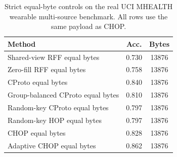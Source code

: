 ﻿\begin{table}[t]
\centering
\caption{Strict equal-byte controls on the real UCI MHEALTH wearable multi-source benchmark. All rows use the same payload as CHOP.}
\label{tab:strict-equal-byte-mhealth}
\begin{tabular}{lcc}
\toprule
Method & Acc. & Bytes \\
\midrule
Shared-view RFF equal bytes & 0.730 & 13876 \\
Zero-fill RFF equal bytes & 0.758 & 13876 \\
CProto equal bytes & 0.840 & 13876 \\
Group-balanced CProto equal bytes & 0.810 & 13876 \\
Random-key CProto equal bytes & 0.797 & 13876 \\
Random-key HOP equal bytes & 0.797 & 13876 \\
CHOP equal bytes & 0.828 & 13876 \\
Adaptive CHOP equal bytes & 0.862 & 13876 \\
\bottomrule
\end{tabular}
\end{table}


